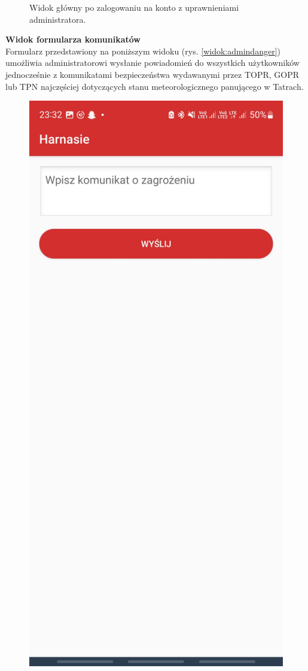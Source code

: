 \begin{figure}[H]
    \caption{Widok główny po zalogowaniu na konto z uprawnieniami administratora.}
    \label{widok:adminhome}
\end{figure}

\noindent
\textbf{Widok formularza komunikatów}\\
\indent Formularz przedstawiony na poniższym widoku (rys. \ref{widok:admindanger}) umożliwia administratorowi wysłanie powiadomień do wszystkich użytkowników jednocześnie z komunikatami bezpieczeństwa wydawanymi przez TOPR, GOPR lub TPN najczęściej dotyczących stanu meteorologicznego panującego w Tatrach.
\begin{figure}[H]
    \centering
    \includegraphics[scale=0.15]{img/imp/widok-admin-danger.jpg}

\end{figure}
